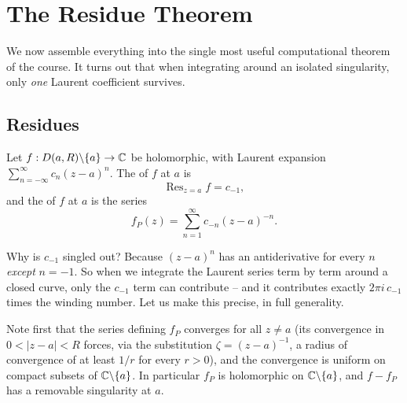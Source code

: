 \documentclass[a4paper]{scrartcl}
\begin{document}
\section{The Residue Theorem}

We now assemble everything into the single most useful computational theorem of the course. It turns out that when integrating around an isolated singularity, only \emph{one} Laurent coefficient survives.

\subsection{Residues}

\begin{definition}
    Let $f: D(a, R) \backslash \{a\} \rightarrow \mathbb{C}$ be holomorphic, with Laurent expansion $\sum_{n = -\infty}^{\infty} c_n (z - a)^n$. The  of $f$ at $a$ is
    $$
    \operatorname{Res}_{z = a} f = c_{-1},
    $$
    and the  of $f$ at $a$ is the series
    $$
    f_P(z) = \sum_{n = 1}^{\infty} c_{-n}(z - a)^{-n}.
    $$
\end{definition}

Why is $c_{-1}$ singled out? Because $(z - a)^n$ has an antiderivative for every $n$ \emph{except} $n = -1$. So when we integrate the Laurent series term by term around a closed curve, only the $c_{-1}$ term can contribute -- and it contributes exactly $2 \pi i \, c_{-1}$ times the winding number. Let us make this precise, in full generality.

Note first that the series defining $f_P$ converges for all $z \neq a$ (its convergence in $0 < |z - a| < R$ forces, via the substitution $\zeta = (z - a)^{-1}$, a radius of convergence of at least $1/r$ for every $r > 0$), and the convergence is uniform on compact subsets of $\mathbb{C} \backslash \{a\}$. In particular $f_P$ is holomorphic on $\mathbb{C} \backslash \{a\}$, and $f - f_P$ has a removable singularity at $a$.
\end{document}
